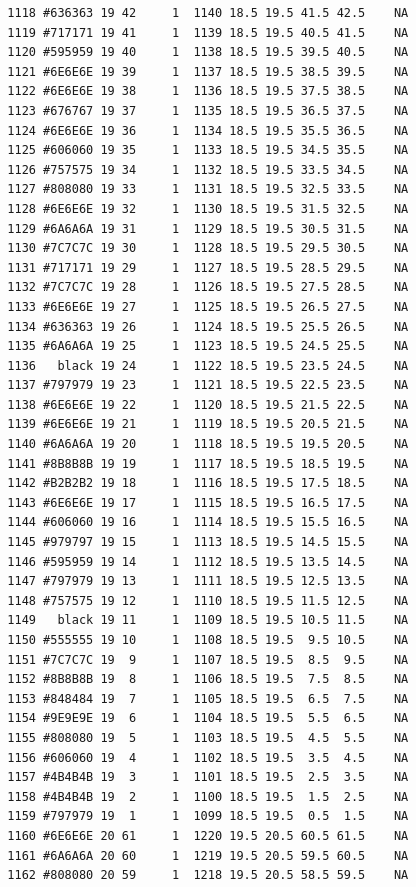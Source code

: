\documentclass[12pt,twoside]{reedthesis}
\begin{document}
\begin{verbatim}
  1118 #636363 19 42     1  1140 18.5 19.5 41.5 42.5    NA
  1119 #717171 19 41     1  1139 18.5 19.5 40.5 41.5    NA
  1120 #595959 19 40     1  1138 18.5 19.5 39.5 40.5    NA
  1121 #6E6E6E 19 39     1  1137 18.5 19.5 38.5 39.5    NA
  1122 #6E6E6E 19 38     1  1136 18.5 19.5 37.5 38.5    NA
  1123 #676767 19 37     1  1135 18.5 19.5 36.5 37.5    NA
  1124 #6E6E6E 19 36     1  1134 18.5 19.5 35.5 36.5    NA
  1125 #606060 19 35     1  1133 18.5 19.5 34.5 35.5    NA
  1126 #757575 19 34     1  1132 18.5 19.5 33.5 34.5    NA
  1127 #808080 19 33     1  1131 18.5 19.5 32.5 33.5    NA
  1128 #6E6E6E 19 32     1  1130 18.5 19.5 31.5 32.5    NA
  1129 #6A6A6A 19 31     1  1129 18.5 19.5 30.5 31.5    NA
  1130 #7C7C7C 19 30     1  1128 18.5 19.5 29.5 30.5    NA
  1131 #717171 19 29     1  1127 18.5 19.5 28.5 29.5    NA
  1132 #7C7C7C 19 28     1  1126 18.5 19.5 27.5 28.5    NA
  1133 #6E6E6E 19 27     1  1125 18.5 19.5 26.5 27.5    NA
  1134 #636363 19 26     1  1124 18.5 19.5 25.5 26.5    NA
  1135 #6A6A6A 19 25     1  1123 18.5 19.5 24.5 25.5    NA
  1136   black 19 24     1  1122 18.5 19.5 23.5 24.5    NA
  1137 #797979 19 23     1  1121 18.5 19.5 22.5 23.5    NA
  1138 #6E6E6E 19 22     1  1120 18.5 19.5 21.5 22.5    NA
  1139 #6E6E6E 19 21     1  1119 18.5 19.5 20.5 21.5    NA
  1140 #6A6A6A 19 20     1  1118 18.5 19.5 19.5 20.5    NA
  1141 #8B8B8B 19 19     1  1117 18.5 19.5 18.5 19.5    NA
  1142 #B2B2B2 19 18     1  1116 18.5 19.5 17.5 18.5    NA
  1143 #6E6E6E 19 17     1  1115 18.5 19.5 16.5 17.5    NA
  1144 #606060 19 16     1  1114 18.5 19.5 15.5 16.5    NA
  1145 #979797 19 15     1  1113 18.5 19.5 14.5 15.5    NA
  1146 #595959 19 14     1  1112 18.5 19.5 13.5 14.5    NA
  1147 #797979 19 13     1  1111 18.5 19.5 12.5 13.5    NA
  1148 #757575 19 12     1  1110 18.5 19.5 11.5 12.5    NA
  1149   black 19 11     1  1109 18.5 19.5 10.5 11.5    NA
  1150 #555555 19 10     1  1108 18.5 19.5  9.5 10.5    NA
  1151 #7C7C7C 19  9     1  1107 18.5 19.5  8.5  9.5    NA
  1152 #8B8B8B 19  8     1  1106 18.5 19.5  7.5  8.5    NA
  1153 #848484 19  7     1  1105 18.5 19.5  6.5  7.5    NA
  1154 #9E9E9E 19  6     1  1104 18.5 19.5  5.5  6.5    NA
  1155 #808080 19  5     1  1103 18.5 19.5  4.5  5.5    NA
  1156 #606060 19  4     1  1102 18.5 19.5  3.5  4.5    NA
  1157 #4B4B4B 19  3     1  1101 18.5 19.5  2.5  3.5    NA
  1158 #4B4B4B 19  2     1  1100 18.5 19.5  1.5  2.5    NA
  1159 #797979 19  1     1  1099 18.5 19.5  0.5  1.5    NA
  1160 #6E6E6E 20 61     1  1220 19.5 20.5 60.5 61.5    NA
  1161 #6A6A6A 20 60     1  1219 19.5 20.5 59.5 60.5    NA
  1162 #808080 20 59     1  1218 19.5 20.5 58.5 59.5    NA

\end{verbatim}
\end{document}
